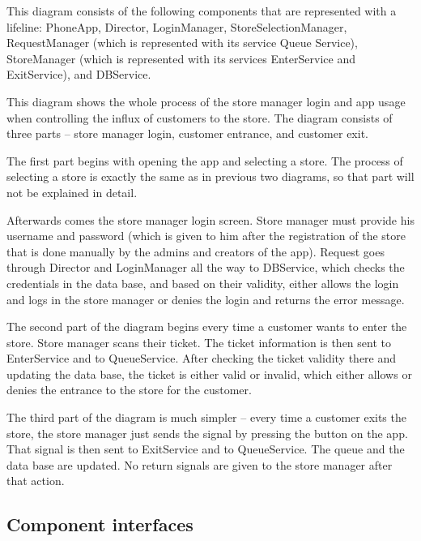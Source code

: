 This diagram consists of the following components that are represented with a lifeline: PhoneApp, Director, LoginManager, StoreSelectionManager, RequestManager (which is represented with its service Queue Service), StoreManager (which is represented with its services EnterService and ExitService), and DBService.  

  

This diagram shows the whole process of the store manager login and app usage when controlling the influx of customers to the store. The diagram consists of three parts – store manager login, customer entrance, and customer exit.  

  

The first part begins with opening the app and selecting a store. The process of selecting a store is exactly the same as in previous two diagrams, so that part will not be explained in detail.  

  

Afterwards comes the store manager login screen. Store manager must provide his username and password (which is given to him after the registration of the store that is done manually by the admins and creators of the app). Request goes through Director and LoginManager all the way to DBService, which checks the credentials in the data base, and based on their validity, either allows the login and logs in the store manager or denies the login and returns the error message.  

  

The second part of the diagram begins every time a customer wants to enter the store. Store manager scans their ticket. The ticket information is then sent to EnterService and to QueueService. After checking the ticket validity there and updating the data base, the ticket is either valid or invalid, which either allows or denies the entrance to the store for the customer.   

  

The third part of the diagram is much simpler – every time a customer exits the store, the store manager just sends the signal by pressing the button on the app. That signal is then sent to ExitService and to QueueService. The queue and the data base are updated. No return signals are given to the store manager after that action.   


\newpage

\subsection{Component interfaces}

